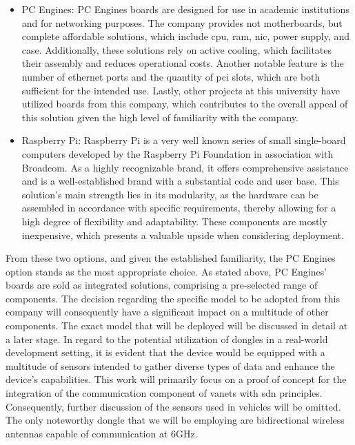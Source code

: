\begin{itemize}
\item PC Engines\cite{noauthor_pc_nodate}: 
PC Engines boards are designed for use in academic institutions and for networking purposes. The company provides not motherboards, but complete affordable solutions, which include \gls{cpu}, \gls{ram}, \gls{nic}, power supply, and case. Additionally, these solutions rely on active cooling, which facilitates their assembly and reduces operational costs. Another notable feature is the number of ethernet ports and the quantity of \gls{pci} slots, which are both sufficient for the intended use. Lastly, other projects at this university have utilized boards from this company, which contributes to the overall appeal of this solution given the high level of familiarity with the company.
\item Raspberry Pi\cite{ltd_buy_nodate}: 
Raspberry Pi is a very well known series of small single-board computers developed by the Raspberry Pi Foundation in association with Broadcom. As a highly recognizable brand, it offers comprehensive assistance and is a well-established brand with a substantial code and user base. This solution's main strength lies in its modularity, as the hardware can be assembled in accordance with specific requirements, thereby allowing for a high degree of flexibility and adaptability. These components are mostly inexpensive, which presents a valuable upside when considering deployment.
\end{itemize}
From these two options, and given the established familiarity, the PC Engines option stands as the most appropriate choice. As stated above, PC Engines' boards are sold as integrated solutions, comprising a pre-selected range of components. The decision regarding the specific model to be adopted from this company will consequently have a significant impact on a multitude of other components. The exact model that will be deployed will be discussed in detail at a later stage. 
In regard to the potential utilization of dongles in a real-world development setting, it is evident that the device would be equipped with a multitude of sensors intended to gather diverse types of data and enhance the device's capabilities. This work will primarily focus on a proof of concept for the integration of the communication component of \glspl{vanet} with \gls{sdn} principles. Consequently, further discussion of the sensors used in vehicles will be omitted. The only noteworthy dongle that we will be employing are bidirectional wireless antennas capable of communication at 6GHz.

